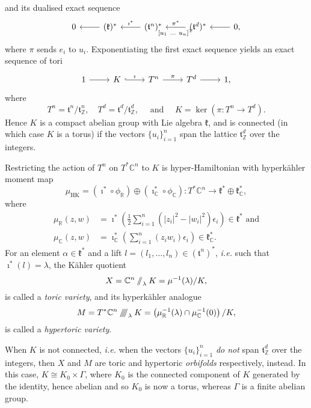 \documentclass{amsart}
\newcommand{\ie}{\emph{i.e.} }
\newcommand{\ra}{\rightarrow}
\newcommand{\e}{\epsilon}
\newcommand{\RR}{\mathbb{R}}
\newcommand{\CC}{\mathbb{C}}
\newcommand{\ZZ}{\mathbb{Z}}
\newcommand{\mfk}{\mathfrak{k}}
\newcommand{\mft}{\mathfrak{t}}
\newcommand{\sslash}{\mathbin{/\mkern-6mu/}}
\newcommand{\sssslash}{\mathbin{/\mkern-6mu/\mkern-6mu/\mkern-6mu/}}
\newcommand{\tuple}[2]{(#1, \ldots, #2)}
\newcommand{\half}{\frac{1}{2}}
\DeclareMathOperator{\HK}{HK}
\begin{document}
	and its dualised exact sequence
	\[
		\begin{tikzcd}[ampersand replacement=\&]
			0 \& \ar[l]	(\mfk)^{\ast} \& \ar[l, "\imath^{\ast}", swap] (\mft^{n})^{\ast} \& \arrow{l}{[u_{1}\ \ldots \ u_{n}]^{T}}[swap]{\pi^{\ast}} (\mft^{d})^{\ast} \& \ar[l] 0,
		\end{tikzcd}
	\]
	where $\pi$ sends $e_{i}$ to $u_{i}$. Exponentiating the first exact sequence yields an exact sequence of tori
	\[
		\begin{tikzcd}[ampersand replacement=\&]
			1 \ar[r] \&	K \ar[r, hook, "\imath"] \& T^{n} \arrow{r}{\pi} \& T^{d} \ar[r] \& 1,
		\end{tikzcd}
	\]
	where 
	\[
		T^{n} = \mft^{n}/\mft_{\ZZ}^{n}, \quad T^{d} = \mft^{d}/\mft_{\ZZ}^{d}, \quad \text{ and } \quad K = \ker(\pi : T^{n} \ra T^{d}).
	\]
	Hence $K$ is a compact abelian group with Lie algebra $\mfk$, and is connected (in which case $K$ is a torus) if the vectors $\{u_{i}\}_{i=1}^{n}$ span the lattice $\mft_{\ZZ}^{d}$ over the integers.
	
	Restricting the action of $T^{n}$ on $T^{\ast}\CC^{n}$ to $K$ is hyper-Hamiltonian with hyperk\"ahler moment map
	\[
		\mu_{\HK} = (\imath^{\ast} \circ \phi_{\RR}) \oplus (\imath_{\CC}^{\ast} \circ \phi_{\CC}) : T^{\ast}\CC^{n} \ra \mfk^{\ast} \oplus \mfk_{\CC}^{\ast},
	\]
	where
	\begin{align*}%
		\mu_{\RR}(z,w) &= \imath^{\ast}\left( \half \sum_{i=1}^{n}(|z_{i}|^{2} - |w_{i}|^{2})\e_{i} \right) \in \mfk^{\ast}
		\mbox{ and}\\
		\mu_{\CC}(z,w) &= \imath_{\CC}^{\ast} \left(\sum_{i=1}^{n}(z_{i}w_{i})\e_{i} \right) \in \mfk_{\CC}^{\ast}.
	\end{align*}
	For an element $\alpha\in \mfk^{\ast}$ and a lift $l = \tuple{l_{1}}{l_{n}} \in (\mft^{n})^{\ast}$, \ie such that $\imath^{\ast}(l) = \lambda$, the K\"ahler quotient
	\[
		X = \CC^{n} \sslash_{\lambda} K = \mu^{-1}(\lambda)/K,
	\]
	is called a \emph{toric variety}, and its hyperk\"ahler analogue
	\[
		M = T^{\ast}\CC^{n} \sssslash_{\lambda} K = \left(\mu_{\RR}^{-1}(\lambda) \cap \mu_{\CC}^{-1}(0)\right)/ K,
	\]
	is called a \emph{hypertoric variety}.
	
	When $K$ is not connected, \ie when the vectors $\{u_{i}\}_{i=1}^{n}$ \emph{do not} span $\mft_{\ZZ}^{d}$ over the integers, then $X$ and $M$ are toric and hypertoric \emph{orbifolds} respectively, instead. In this case, $K \cong K_{0} \times \Gamma$, where $K_{0}$ is the connected component of $K$ generated by the identity, hence abelian and so $K_{0}$ is now a torus, whereas $\Gamma$ is a finite abelian group.
	
\end{document}
